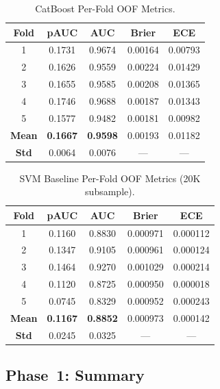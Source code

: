 \documentclass[conference]{IEEEtran}
\begin{document}
\begin{table}[!t]
  \centering
  \caption{CatBoost Per-Fold OOF Metrics.}
  \label{tab:fold_cb}
  \renewcommand{\arraystretch}{1.1}
  \begin{tabular}{ccccc}
    \toprule
    \textbf{Fold} & \textbf{pAUC} & \textbf{AUC} & \textbf{Brier} & \textbf{ECE} \\
    \midrule
    1 & 0.1731 & 0.9674 & 0.00164 & 0.00793 \\
    2 & 0.1626 & 0.9559 & 0.00224 & 0.01429 \\
    3 & 0.1655 & 0.9585 & 0.00208 & 0.01365 \\
    4 & 0.1746 & 0.9688 & 0.00187 & 0.01343 \\
    5 & 0.1577 & 0.9482 & 0.00181 & 0.00982 \\
    \midrule
    \textbf{Mean} & \textbf{0.1667} & \textbf{0.9598} & 0.00193 & 0.01182 \\
    \textbf{Std}  & 0.0064 & 0.0076 & --- & --- \\
    \bottomrule
  \end{tabular}
\end{table}

\begin{table}[!t]
  \centering
  \caption{SVM Baseline Per-Fold OOF Metrics (20K subsample).}
  \label{tab:fold_svm}
  \renewcommand{\arraystretch}{1.1}
  \begin{tabular}{ccccc}
    \toprule
    \textbf{Fold} & \textbf{pAUC} & \textbf{AUC} & \textbf{Brier} & \textbf{ECE} \\
    \midrule
    1 & 0.1160 & 0.8830 & 0.000971 & 0.000112 \\
    2 & 0.1347 & 0.9105 & 0.000961 & 0.000124 \\
    3 & 0.1464 & 0.9270 & 0.001029 & 0.000214 \\
    4 & 0.1120 & 0.8725 & 0.000950 & 0.000018 \\
    5 & 0.0745 & 0.8329 & 0.000952 & 0.000243 \\
    \midrule
    \textbf{Mean} & \textbf{0.1167} & \textbf{0.8852} & 0.000973 & 0.000142 \\
    \textbf{Std}  & 0.0245 & 0.0325 & --- & --- \\
    \bottomrule
  \end{tabular}
\end{table}

\subsection{Phase~1: Summary}
\end{document}
